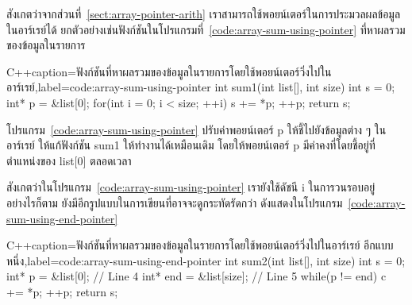 สังเกต{\wbr}ว่า{\wbr}จาก{\wbr}ส่วน{\wbr}ที่~\ref{sect:array-pointer-arith}
เรา{\wbr}สามารถ{\wbr}ใช้{\wbr}พอยน์เตอร์{\wbr}ใน{\wbr}การ{\wbr}ประมวล{\wbr}ผล{\wbr}ข้อมูล{\wbr}ใน{\wbr}อาร์{\wbr}เรย์{\wbr}ได้{\wbr}
ยก{\wbr}ตัวอย่าง{\wbr}เช่น{\wbr}ฟังก์ชัน{\wbr}ใน{\wbr}โปรแกรม{\wbr}ที่~\ref{code:array-sum-using-pointer}
ที่{\wbr}หา{\wbr}ผล{\wbr}รวม{\wbr}ของ{\wbr}ข้อมูล{\wbr}ใน{\wbr}รายการ{\wbr}

\latintext
\begin{codelist}{C++}{caption={\thaitext ฟังก์ชัน{\wbr}ที่{\wbr}หา{\wbr}ผล{\wbr}รวม{\wbr}ของ{\wbr}ข้อมูล{\wbr}ใน{\wbr}รายการ{\wbr}โดย{\wbr}ใช้{\wbr}พอยน์เตอร์{\wbr}วิ่ง{\wbr}ไป{\wbr}ใน{\wbr}อาร์{\wbr}เรย์\latintext},label=code:array-sum-using-pointer}
int sum1(int list[], int size)            
{
  int s = 0;
  int* p = &list[0];
  for(int i = 0; i < size; ++i) {
    s += *p;
    ++p;
  }
  return s;
}
\end{codelist}
\thaitext

\begin{quiz}{}
โปรแกรม~\ref{code:array-sum-using-pointer} ปรับ{\wbr}ค่า{\wbr}พอยน์เตอร์ {\ct p}
ให้{\wbr}ชี้{\wbr}ไป{\wbr}ยัง{\wbr}ข้อมูล{\wbr}ต่าง ๆ ใน{\wbr}อาร์{\wbr}เรย์ ให้{\wbr}แก้{\wbr}ฟังก์ชัน {\ct sum1} ให้{\wbr}ทำงาน{\wbr}ได้{\wbr}เหมือน{\wbr}เดิม{\wbr}
โดย{\wbr}ให้{\wbr}พอยน์เตอร์ {\ct p} มี{\wbr}ค่า{\wbr}คงที่{\wbr}โดย{\wbr}ชี้{\wbr}อยู่{\wbr}ที่{\wbr}ตำแหน่ง{\wbr}ของ {\ct list[0]} ตลอด{\wbr}เวลา{\wbr}
\end{quiz}

สังเกต{\wbr}ว่า{\wbr}ใน{\wbr}โปรแกรม~\ref{code:array-sum-using-pointer} เรา{\wbr}ยัง{\wbr}ใช้{\wbr}ดัชนี {\ct i}
ใน{\wbr}การ{\wbr}วน{\wbr}รอบ{\wbr}อยู่ อย่างไร{\wbr}ก็{\wbr}ตาม ยัง{\wbr}มี{\wbr}อีก{\wbr}รูปแบบ{\wbr}ใน{\wbr}การ{\wbr}เขียน{\wbr}ที่{\wbr}อาจ{\wbr}จะ{\wbr}ดู{\wbr}กระ{\wbr}ทัด{\wbr}รัด{\wbr}กว่า{\wbr}
ดัง{\wbr}แสดง{\wbr}ใน{\wbr}โปรแกรม~\ref{code:array-sum-using-end-pointer}

\latintext
\begin{codelist}{C++}{caption={\thaitext ฟังก์ชัน{\wbr}ที่{\wbr}หา{\wbr}ผล{\wbr}รวม{\wbr}ของ{\wbr}ข้อมูล{\wbr}ใน{\wbr}รายการ{\wbr}โดย{\wbr}ใช้{\wbr}พอยน์เตอร์{\wbr}วิ่ง{\wbr}ไป{\wbr}ใน{\wbr}อาร์{\wbr}เรย์ อีก{\wbr}แบบ{\wbr}หนึ่ง\latintext},label=code:array-sum-using-end-pointer}
int sum2(int list[], int size)
{
  int s = 0;
  int* p = &list[0];             // Line 4
  int* end = &list[size];        // Line 5
  while(p != end) {
    c += *p;
    ++p;
  }
  return s;
}
\end{codelist}
\thaitext

